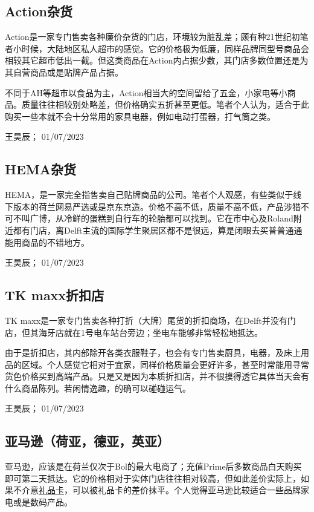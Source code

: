 \subsection{Action杂货}
Action是一家专门售卖各种廉价杂货的门店，环境较为脏乱差；颇有种21世纪初笔者小时候，大陆地区私人超市的感觉。它的价格极为低廉，同样品牌同型号商品会相较其它超市低出一截。但这类商品在Action内占据少数，其门店多数位置还是为其自营商品或是贴牌产品占据。

不同于AH等超市以食品为主，Action相当大的空间留给了五金，小家电等小商品。质量往往相较别处略差，但价格确实五折甚至更低。笔者个人认为，适合于此购买一些本就不会十分常用的家具电器，例如电动打蛋器，打气筒之类。
\begin{flushright}
王昊辰； 01/07/2023
\end{flushright}

\subsection{HEMA杂货}
HEMA，是一家完全指售卖自己贴牌商品的公司。笔者个人观感，有些类似于线下版本的荷兰网易严选或是京东京造。价格不高不低，质量不高不低，产品涉猎不可不叫广博，从冷鲜的蛋糕到自行车的轮胎都可以找到。它在市中心及Roland附近都有门店，离Delft主流的国际学生聚居区都不是很远，算是闭眼去买普普通通能用商品的不错地方。
\begin{flushright}
王昊辰； 01/07/2023
\end{flushright}

\subsection{TK maxx折扣店}
TK maxx是一家专门售卖各种打折（大牌）尾货的折扣商场，在Delft并没有门店，但其海牙店就在1号电车站台旁边；坐电车能够非常轻松地抵达。

由于是折扣店，其内部除开各类衣服鞋子，也会有专门售卖厨具，电器，及床上用品的区域。个人感觉它相对于宜家，同样价格质量会更好许多，甚至时常能用寻常货色价格买到高端产品。只是又是因为本质折扣店，并不很摸得透它具体当天会有什么商品陈列。若闲情逸趣，的确可以碰碰运气。
\begin{flushright}
王昊辰； 01/07/2023
\end{flushright}

\subsection{亚马逊（荷亚，德亚，英亚）}
亚马逊，应该是在荷兰仅次于Bol的最大电商了；充值Prime后多数商品白天购买即可第二天抵达。它的价格相对于实体门店往往相对较高，但如此差价实际上，如果不介意\hyperlink{礼品卡}{\uline{礼品卡}}，可以被礼品卡的差价抹平。个人觉得亚马逊比较适合一些品牌家电或是数码产品。

